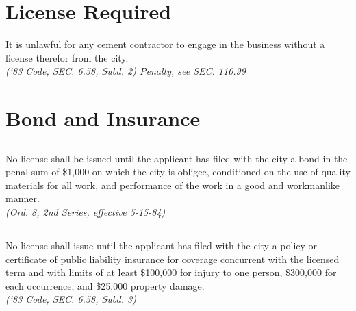\section{License Required}
It is unlawful for any cement contractor to engage in the business without a license therefor from the city.\\
\emph{(‘83 Code, SEC. 6.58, Subd. 2)  Penalty, see SEC. 110.99}
\section{Bond and Insurance}
\subsection{}
No license shall be issued until the applicant has filed with the city a bond in the penal sum of \$1,000 on which the city is obligee, conditioned on the use of quality materials for all work, and performance of the work in a good and workmanlike manner.\\
\emph{(Ord. 8, 2nd Series, effective 5-15-84)}
\subsection{}
No license shall issue until the applicant has filed with the city a policy or certificate of public liability insurance for coverage concurrent with the licensed term and with limits of at least \$100,000 for injury to one person, \$300,000 for each occurrence, and \$25,000 property damage.\\
\emph{(‘83 Code, SEC. 6.58, Subd. 3)}
